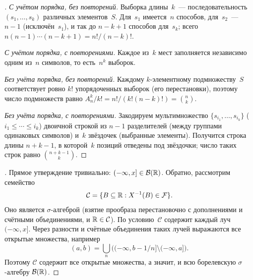 \begin{proof}[]
\emph{С учётом порядка, без повторений.} Выборка длины~$k$~--- последовательность $(s_1, \dots, s_k)$ различных элементов~$S$. Для~$s_1$ имеется~$n$ способов, для~$s_2$~--- $n - 1$ (исключён~$s_1$), и так до $n - k + 1$ способов для~$s_k$; всего $n(n-1)\cdots(n-k+1) = n!/(n-k)!$.

\emph{С учётом порядка, с повторениями.} Каждое из~$k$ мест заполняется независимо одним из~$n$ символов, то есть~$n^k$ выборок.

\emph{Без учёта порядка, без повторений.} Каждому $k$-элементному подмножеству~$S$ соответствует ровно $k!$ упорядоченных выборок (его перестановки), поэтому число подмножеств равно $A_n^k / k! = n! / (k!(n-k)!) = \binom{n}{k}$.

\emph{Без учёта порядка, с повторениями.} Закодируем мультимножество $\{s_{i_1}, \dots, s_{i_k}\}$ ($i_1 \leq \cdots \leq i_k$) двоичной строкой из $n - 1$ разделителей (между группами одинаковых символов) и~$k$ звёздочек (выбранные элементы). Получится строка длины $n + k - 1$, в которой~$k$ позиций отведены под звёздочки; число таких строк равно $\binom{n+k-1}{k}$.
\end{proof}

\begin{proof}[]
Прямое утверждение тривиально: $(-\infty, x] \in \mathcal{B}(\mathbb{R})$. Обратно, рассмотрим семейство
\[
  \mathcal{C} = \{B \subseteq \mathbb{R} : X^{-1}(B) \in \mathcal{F}\}.
\]
Оно является $\sigma$-алгеброй (взятие прообраза перестановочно с дополнениями и счётными объединениями, и $\mathbb{R} \in \mathcal{C}$). По условию~$\mathcal{C}$ содержит каждый луч $(-\infty, x]$. Через разности и счётные объединения таких лучей выражаются все открытые множества, например
\[
  (a, b) = \bigcup_{n} \bigl((-\infty, b - 1/n] \setminus (-\infty, a]\bigr).
\]
Поэтому $\mathcal{C}$ содержит все открытые множества, а значит, и всю борелевскую $\sigma$-алгебру $\mathcal{B}(\mathbb{R})$.
\end{proof}

